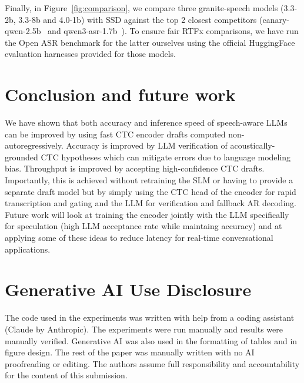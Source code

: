 \documentclass[cameraready]{Interspeech}
\begin{document}
Finally, in Figure~\ref{fig:comparison}, we compare three granite-speech models (3.3-2b, 3.3-8b and 4.0-1b) with SSD against the top 2 closest competitors (canary-qwen-2.5b~\cite{chen2024salm,sekoyan2025canary} and qwen3-asr-1.7b~\cite{shi2026qwen3asrtechnicalreport}). To ensure fair RTFx comparisons, we have run the Open ASR benchmark for the latter ourselves using the official HuggingFace evaluation harnesses provided for those models. 

\section{Conclusion and future work}
\label{sec:conclusion}
We have shown that both accuracy and inference speed of speech-aware LLMs can be improved by using fast CTC encoder drafts computed non-autoregressively. Accuracy is improved by LLM verification of acoustically-grounded CTC hypotheses which can mitigate errors due to language modeling bias. Throughput is improved by accepting high-confidence CTC drafts. Importantly, this is achieved without retraining the SLM or having to provide a separate draft model but by simply using the CTC head of the encoder for rapid transcription and gating and the LLM for verification and fallback AR decoding. 
Future work will look at training the encoder jointly with the LLM specifically for speculation (high LLM acceptance rate while maintaing accuracy) and at applying some of these ideas to reduce latency for real-time conversational applications.

\section{Generative AI Use Disclosure}
The code used in the experiments was written with help from a coding assistant (Claude by Anthropic). The experiments were run manually and results were manually verified. Generative AI was also used in the formatting of tables and in figure design. The rest of the paper was manually written with no AI proofreading or editing. The authors assume full responsibility and accountability for the content of this submission.



\end{document}
